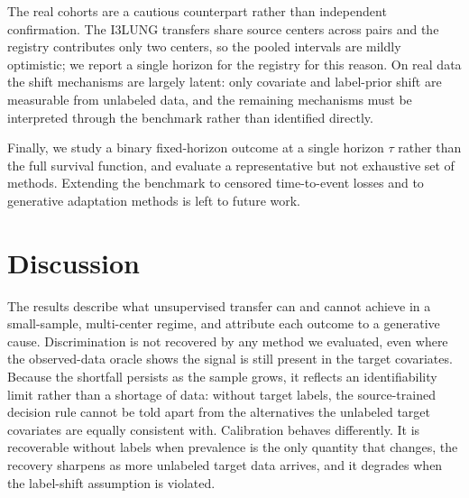 The real cohorts are a cautious counterpart rather than independent
confirmation. The I3LUNG transfers share source centers across pairs and the
registry contributes only two centers, so the pooled intervals are mildly
optimistic; we report a single horizon for the registry for this reason. On real
data the shift mechanisms are largely latent: only covariate and label-prior
shift are measurable from unlabeled data, and the remaining mechanisms must be
interpreted through the benchmark rather than identified directly.

Finally, we study a binary fixed-horizon outcome at a single horizon $\tau$
rather than the full survival function, and evaluate a representative but not
exhaustive set of methods. Extending the benchmark to censored time-to-event
losses and to generative adaptation methods is left to future work.


\section{Discussion}

The results describe what unsupervised transfer can and cannot achieve in a
small-sample, multi-center regime, and attribute each outcome to a generative
cause. Discrimination is not recovered by any method we evaluated, even where
the observed-data oracle shows the signal is still present in the target
covariates. Because the shortfall persists as the sample grows, it reflects an
identifiability limit rather than a shortage of data: without target labels,
the source-trained decision rule cannot be told apart from the alternatives the
unlabeled target covariates are equally consistent with. Calibration behaves
differently. It is recoverable without labels when prevalence is the only
quantity that changes, the recovery sharpens as more unlabeled target data
arrives, and it degrades when the label-shift assumption is violated.

